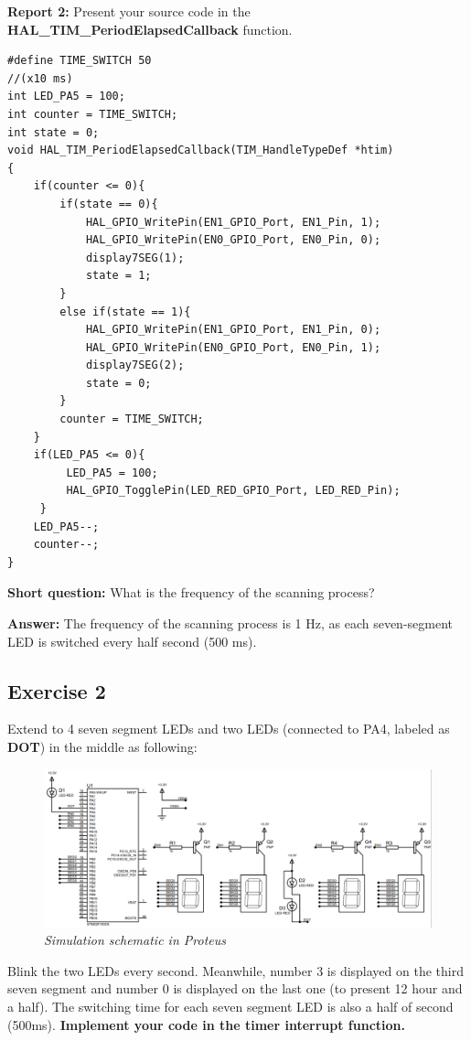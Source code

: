 \documentclass[twoside, final]{hcmut_report}
\begin{document}
\pagebreak
\textbf{Report 2: } Present your source code in the \textbf{HAL\_TIM\_PeriodElapsedCallback} function.\\

\begin{lstlisting}[caption=The \textbf{HAL\_TIM\_PeriodElapsedCallback} function]
#define TIME_SWITCH 50
//(x10 ms)
int LED_PA5 = 100;
int counter = TIME_SWITCH;
int state = 0;
void HAL_TIM_PeriodElapsedCallback(TIM_HandleTypeDef *htim)
{
	if(counter <= 0){
		if(state == 0){
			HAL_GPIO_WritePin(EN1_GPIO_Port, EN1_Pin, 1);
			HAL_GPIO_WritePin(EN0_GPIO_Port, EN0_Pin, 0);
			display7SEG(1);
			state = 1;
		}
		else if(state == 1){
			HAL_GPIO_WritePin(EN1_GPIO_Port, EN1_Pin, 0);
			HAL_GPIO_WritePin(EN0_GPIO_Port, EN0_Pin, 1);
			display7SEG(2);
			state = 0;
		}
		counter = TIME_SWITCH;
	}
	if(LED_PA5 <= 0){
		 LED_PA5 = 100;
		 HAL_GPIO_TogglePin(LED_RED_GPIO_Port, LED_RED_Pin);
	 }
	LED_PA5--;
	counter--;
}
\end{lstlisting}

\textbf{Short question: } What is the frequency of the scanning process?

\textbf{Answer: } The frequency of the scanning process is 1 Hz, as each seven-segment LED is switched every half second (500 ms).
\subsection{Exercise 2}
Extend to 4 seven segment LEDs and two LEDs (connected to PA4, labeled as \textbf{DOT}) in the middle as following:

\begin{figure}[!htp]
    \centering
    \includegraphics[width=5.5in]{graphics/lab2_ex2a.PNG}
    \caption{\textit{Simulation schematic in Proteus}}
    \label{bai2_pic1a}
\end{figure}

Blink the two LEDs every second. Meanwhile, number 3 is displayed on the third seven segment and number 0 is displayed on the last one (to present 12 hour and a half). The switching time for each seven segment LED is also a half of second (500ms). \textbf{Implement your code in the timer interrupt function.}\\
\end{document}

